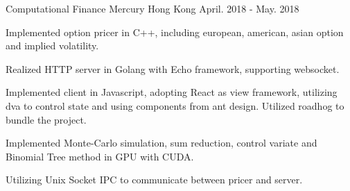 \cventry
{Computational Finance} %
{Mercury} %
{Hong Kong} %
{April. 2018 - May. 2018} %
{ %
	\begin{cvitems}
		\item {Implemented option pricer in C++, including european, american, asian option and implied volatility.}
		\item {Realized HTTP server in Golang with Echo framework, supporting websocket.}
		\item {Implemented client in Javascript, adopting React as view framework, utilizing dva to control state and using components from ant design.
		Utilized roadhog to bundle the project.}
		\item {Implemented Monte-Carlo simulation, sum reduction, control variate and Binomial Tree method in GPU with CUDA.}    
		\item {Utilizing Unix Socket IPC to communicate between pricer and server.}
	\end{cvitems}
}